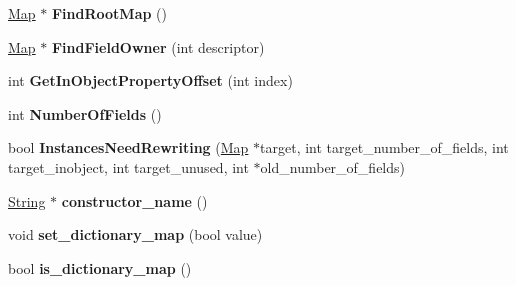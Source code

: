 \begin{DoxyCompactItemize}
\item 
\hypertarget{classv8_1_1internal_1_1_map_aa6e0e5a0ad270fbf6c73b408ed7f2ddb}{}\hyperlink{classv8_1_1internal_1_1_map}{Map} $\ast$ {\bfseries Find\+Root\+Map} ()\label{classv8_1_1internal_1_1_map_aa6e0e5a0ad270fbf6c73b408ed7f2ddb}

\item 
\hypertarget{classv8_1_1internal_1_1_map_ad79ec56ac28debea19950087ffc0fa6e}{}\hyperlink{classv8_1_1internal_1_1_map}{Map} $\ast$ {\bfseries Find\+Field\+Owner} (int descriptor)\label{classv8_1_1internal_1_1_map_ad79ec56ac28debea19950087ffc0fa6e}

\item 
\hypertarget{classv8_1_1internal_1_1_map_ab5e495c4ab1986123f55529bf8794440}{}int {\bfseries Get\+In\+Object\+Property\+Offset} (int index)\label{classv8_1_1internal_1_1_map_ab5e495c4ab1986123f55529bf8794440}

\item 
\hypertarget{classv8_1_1internal_1_1_map_a51c719d96f0a96dfaa3209e070a44bb1}{}int {\bfseries Number\+Of\+Fields} ()\label{classv8_1_1internal_1_1_map_a51c719d96f0a96dfaa3209e070a44bb1}

\item 
\hypertarget{classv8_1_1internal_1_1_map_a022f7551714b8ee4dde04aa6a6e2a916}{}bool {\bfseries Instances\+Need\+Rewriting} (\hyperlink{classv8_1_1internal_1_1_map}{Map} $\ast$target, int target\+\_\+number\+\_\+of\+\_\+fields, int target\+\_\+inobject, int target\+\_\+unused, int $\ast$old\+\_\+number\+\_\+of\+\_\+fields)\label{classv8_1_1internal_1_1_map_a022f7551714b8ee4dde04aa6a6e2a916}

\item 
\hypertarget{classv8_1_1internal_1_1_map_a1729d536a45f25d05299850021476963}{}\hyperlink{classv8_1_1internal_1_1_string}{String} $\ast$ {\bfseries constructor\+\_\+name} ()\label{classv8_1_1internal_1_1_map_a1729d536a45f25d05299850021476963}

\item 
\hypertarget{classv8_1_1internal_1_1_map_af3463563977ce7d2e4fa5f52879284ee}{}void {\bfseries set\+\_\+dictionary\+\_\+map} (bool value)\label{classv8_1_1internal_1_1_map_af3463563977ce7d2e4fa5f52879284ee}

\item 
\hypertarget{classv8_1_1internal_1_1_map_a6f2a37aaa50b78b41fecb271b2c83581}{}bool {\bfseries is\+\_\+dictionary\+\_\+map} ()\label{classv8_1_1internal_1_1_map_a6f2a37aaa50b78b41fecb271b2c83581}


\end{DoxyCompactItemize}
